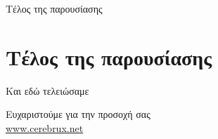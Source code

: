\documentclass{beamer}							%
\begin{document}
\begin{frame}{Τέλος της παρουσίασης}
\section{Τέλος της παρουσίασης}
Και εδώ τελειώσαμε
\begin{center}
{\LARGE Ευχαριστούμε για την προσοχή σας}\\
\vspace{24pt}
\url {www.cerebrux.net}
\end{center}
\end{frame}
\end{document}
